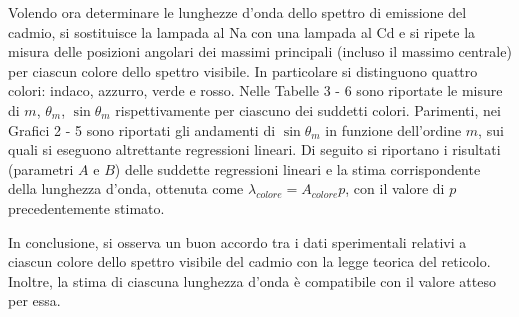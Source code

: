 \documentclass{article}
\begin{document}
	Volendo ora determinare le lunghezze d'onda dello spettro di emissione del cadmio, si sostituisce la lampada al Na con una lampada al Cd e si ripete la misura delle posizioni angolari dei massimi principali (incluso il massimo centrale) per ciascun colore dello spettro visibile. In particolare si distinguono quattro colori: indaco, azzurro, verde e rosso. Nelle Tabelle 3 - 6 sono riportate le misure di $m$, $\theta_m$, $\sin \theta_m$ rispettivamente per ciascuno dei suddetti colori. Parimenti, nei Grafici 2 - 5 sono riportati gli andamenti di $\sin \theta_m$ in funzione dell'ordine $m$, sui quali si eseguono altrettante regressioni lineari. Di seguito si riportano i risultati (parametri $A$ e $B$) delle suddette regressioni lineari e la stima corrispondente della lunghezza d'onda, ottenuta come $\lambda_{colore}= A_{colore} p$, con il valore di $p$ precedentemente stimato.

	In conclusione, si osserva un buon accordo tra i dati sperimentali relativi a ciascun colore dello spettro visibile del cadmio con la legge teorica del reticolo. Inoltre, la stima di ciascuna lunghezza d'onda è compatibile con il valore atteso per essa.
\end{document}
